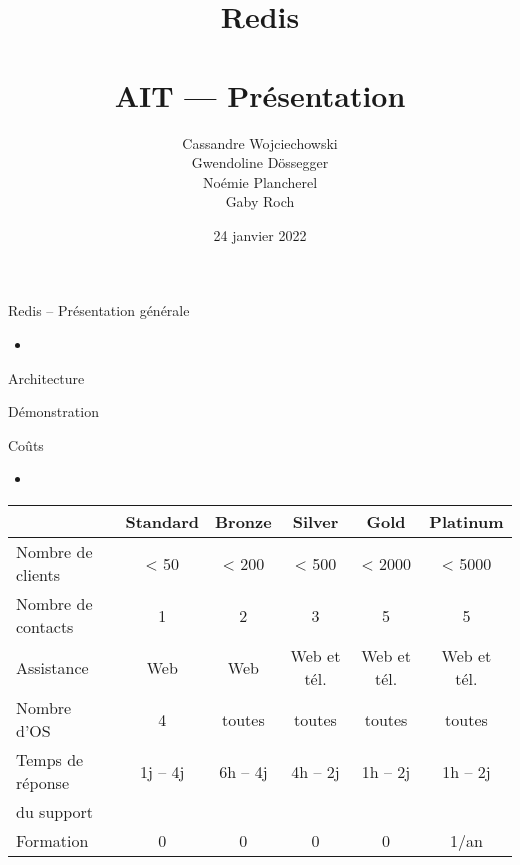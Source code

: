 \documentclass[aspectratio=169]{beamer}
\title{Redis\\~\\AIT --- Présentation}
\author{Cassandre Wojciechowski \\ Gwendoline Dössegger \\ Noémie Plancherel \\ Gaby Roch}
\date{24 janvier 2022}
\begin{document}
\begin{frame}
  \titlepage
\end{frame}

\begin{frame}{Redis -- Présentation générale}
 \begin{itemize}
  \item 
 \end{itemize}
\end{frame}

\begin{frame}{Architecture}
\end{frame}

\begin{frame}{Démonstration}
\end{frame}

\begin{frame}{Coûts}
\begin{center}

\begin{itemize}
    \item 
\end{itemize}

 \begin{tabular}{|l|ccccc|}
    \hline
    & Standard & Bronze & Silver & Gold & Platinum \\
    \hline
    \hline
    Nombre de clients & < 50 & < 200 & < 500 & < 2000 & < 5000 \\
    \hline
    Nombre de contacts & 1 & 2 & 3 & 5 & 5 \\
    \hline
    Assistance & Web & Web & Web et tél.& Web et tél. & Web et tél. \\
    \hline
    Nombre d'OS & 4 & toutes & toutes & toutes & toutes \\
    \hline
    Temps de réponse & 1j -- 4j & 6h -- 4j & 4h -- 2j & 1h -- 2j & 1h -- 2j \\ %
    du support &  & & & & \\
    \hline
    Formation & 0 & 0 & 0 & 0 & 1/an \\
    \hline
 \end{tabular}
\end{center}
\end{frame}
\end{document}
